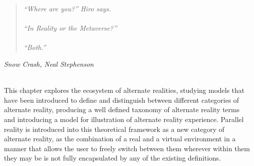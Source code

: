 \begin{quote}
\textit{``Where are you?'' Hiro says.
\\
\\
``In Reality or the Metaverse?''
\\
\\
``Both.''}
\end{quote}
\hfill \textit{Snow Crash, Neal Stephenson}
\\
\\


\label{chapter-background}



This chapter explores the ecosystem of alternate realities, studying models that have been introduced to define and distinguish between different categories of alternate reality, producing a well defined taxonomy of alternate reality terms and introducing a model for illustration of alternate reality experience. Parallel reality is introduced into this theoretical framework as a new category of alternate reality, as the combination of a real and a virtual environment in a manner that allows the user to freely switch between them wherever within them they may be is not fully encapsulated by any of the existing definitions.










